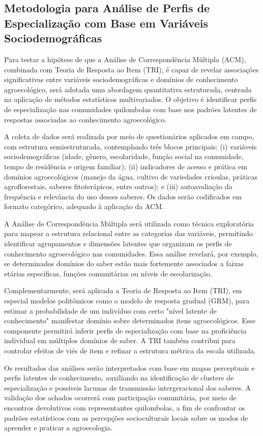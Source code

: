 \subsection{Metodologia para Análise de Perfis de Especialização com Base em Variáveis Sociodemográficas}

Para testar a hipótese de que a Análise de Correspondência Múltipla (ACM), combinada com Teoria de Resposta ao Item (TRI), é capaz de revelar associações significativas entre variáveis sociodemográficas e domínios de conhecimento agroecológico, será adotada uma abordagem quantitativa estruturada, centrada na aplicação de métodos estatísticos multivariados. O objetivo é identificar perfis de especialização nas comunidades quilombolas com base nos padrões latentes de respostas associadas ao conhecimento agroecológico.

A coleta de dados será realizada por meio de questionários aplicados em campo, com estrutura semiestruturada, contemplando três blocos principais: (i) variáveis sociodemográficas (idade, gênero, escolaridade, função social na comunidade, tempo de residência e origem familiar); (ii) indicadores de acesso e prática em domínios agroecológicos (manejo da água, cultivo de variedades crioulas, práticas agroflorestais, saberes fitoterápicos, entre outros); e (iii) autoavaliação da frequência e relevância do uso desses saberes. Os dados serão codificados em formato categórico, adequado à aplicação da ACM.

A Análise de Correspondência Múltipla será utilizada como técnica exploratória para mapear a estrutura relacional entre as categorias das variáveis, permitindo identificar agrupamentos e dimensões latentes que organizam os perfis de conhecimento agroecológico nas comunidades. Essa análise revelará, por exemplo, se determinados domínios do saber estão mais fortemente associados a faixas etárias específicas, funções comunitárias ou níveis de escolarização.

Complementarmente, será aplicada a Teoria de Resposta ao Item (TRI), em especial modelos politômicos como o modelo de resposta gradual (GRM), para estimar a probabilidade de um indivíduo com certo "nível latente de conhecimento" manifestar domínio sobre determinados itens agroecológicos. Esse componente permitirá inferir perfis de especialização com base na proficiência individual em múltiplos domínios de saber. A TRI também contribui para controlar efeitos de viés de item e refinar a estrutura métrica da escala utilizada.

Os resultados das análises serão interpretados com base em mapas perceptuais e perfis latentes de conhecimento, auxiliando na identificação de clusters de especialização e possíveis lacunas de transmissão intergeracional dos saberes. A validação dos achados ocorrerá com participação comunitária, por meio de encontros devolutivos com representantes quilombolas, a fim de confrontar os padrões estatísticos com as percepções socioculturais locais sobre os modos de aprender e praticar a agroecologia.

